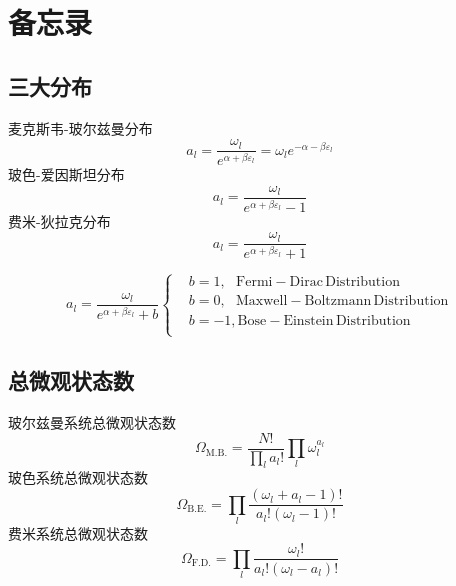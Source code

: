 \section{备忘录}

\subsection{三大分布}
麦克斯韦-玻尔兹曼分布
$$a_l=\frac{\omega _l}{e^{\alpha +\beta \varepsilon _l}}=\omega _le^{-\alpha -\beta \varepsilon _l}
$$
玻色-爱因斯坦分布
$$a_l=\frac{\omega _l}{e^{\alpha +\beta \varepsilon _l}-1}$$
费米-狄拉克分布
$$a_l=\frac{\omega _l}{e^{\alpha +\beta \varepsilon _l}+1}$$



$$
a_l=\frac{\omega _l}{e^{\alpha +\beta \varepsilon _l}+b}\left\{ \begin{aligned}
	&b=1, \,\,\,\,\mathrm{Fermi-Dirac}\, \mathrm{Distribution}\\
	&b=0, \,\,\,\,\mathrm{Maxwell-Boltzmann} \,\mathrm{Distribution}\\
	&b=-1, \mathrm{Bose-Einstein} \,\mathrm{Distribution}\\
\end{aligned} \right. 
$$


\subsection{总微观状态数}
玻尔兹曼系统总微观状态数$$\Omega _{\mathrm{M}.\mathrm{B}.}=\frac{N!}{\prod_l{a_l!}}\prod_l{\omega _{l}^{a_l}}
$$
玻色系统总微观状态数$$\Omega _{\mathrm{B}.\mathrm{E}.}=\prod_l{\frac{\left( \omega _l+a_l-1 \right) !}{a_l!\left( \omega _l-1 \right) !}}
$$
费米系统总微观状态数$$\Omega _{\mathrm{F}.\mathrm{D}.}=\prod_l{\frac{\omega _l!}{a_l!\left( \omega _l-a_l \right) !}}
$$


